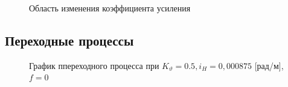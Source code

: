 \documentclass[a4paper,12pt]{article}
\begin{document}
\begin{enumerate}
    \begin{figure}[H]
        \caption{Область изменения коэффициента усиления}
        \label{fig:Область изменения коэффициента усиления}
    \end{figure}

    \end{enumerate}
    
    \subsection{Переходные процессы}

    \begin{figure}[H]
        \caption{График ппереходного процесса при $K_{\vartheta}=0.5, i_H=0,000875$ [рад/м], $f=0$}
        \label{fig:Переходный процесс 1}
    \end{figure}
\end{document}
